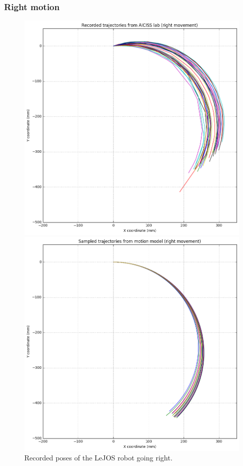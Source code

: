 \documentclass[paper=a4, fontsize=11pt]{scrartcl} %
\begin{document}
    \subsubsection*{Right motion}
    \begin{figure}[h!]
        \centering
        \begin{minipage}{0.5\textwidth}
            \centering
            \includegraphics[width=1\textwidth]{images/recorded_poses_right.png} %
            \caption{Recorded poses of the LeJOS robot going right.}
        \end{minipage}\hfill
        \begin{minipage}{0.5\textwidth}
            \centering
            \includegraphics[width=1\textwidth]{images/sampled_poses_right.png} %

\end{minipage}
\end{figure}
\end{document}
